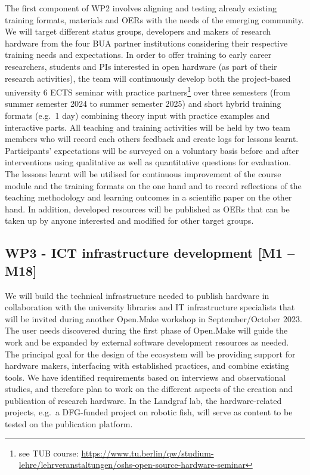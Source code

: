 \documentclass[
  12pt,
  a4paper,
]{article}
\begin{document}
The first component of WP2 involves aligning and testing already
existing training formats, materials and OERs with the needs of the
emerging community. We will target different status groups, developers
and makers of research hardware from the four BUA partner institutions
considering their respective training needs and expectations. In order
to offer training to early career researchers, students and PIs
interested in open hardware (as part of their research activities), the
team will continuously develop both the project-based university 6 ECTS
seminar with practice partners\footnote{see TUB course:
  \url{https://www.tu.berlin/qw/studium-lehre/lehrveranstaltungen/oshs-open-source-hardware-seminar}}
over three semesters (from summer semester 2024 to summer semester 2025)
and short hybrid training formats (e.g.~1 day) combining theory input
with practice examples and interactive parts. All teaching and training
activities will be held by two team members who will record each others
feedback and create logs for lessons learnt. Participants' expectations
will be surveyed on a voluntary basis before and after interventions
using qualitative as well as quantitative questions for evaluation. The
lessons learnt will be utilised for continuous improvement of the course
module and the training formats on the one hand and to record
reflections of the teaching methodology and learning outcomes in a
scientific paper on the other hand. In addition, developed resources
will be published as OERs that can be taken up by anyone interested and
modified for other target groups.

\hypertarget{wp3---ict-infrastructure-development-m1-m18}{%
\subsection{WP3 - ICT infrastructure development {[}M1 --
M18{]}}\label{wp3---ict-infrastructure-development-m1-m18}}

We will build the technical infrastructure needed to publish hardware in
collaboration with the university libraries and IT infrastructure
specialists that will be invited during another Open.Make workshop in
September/October 2023. The user needs discovered during the first phase
of Open.Make will guide the work and be expanded by external software
development resources as needed. The principal goal for the design of
the ecosystem will be providing support for hardware makers, interfacing
with established practices, and combine existing tools. We have
identified requirements based on interviews and observational studies,
and therefore plan to work on the different aspects of the creation and
publication of research hardware. In the Landgraf lab, the
hardware-related projects, e.g.~a DFG-funded project on robotic fish,
will serve as content to be tested on the publication platform.
\end{document}
